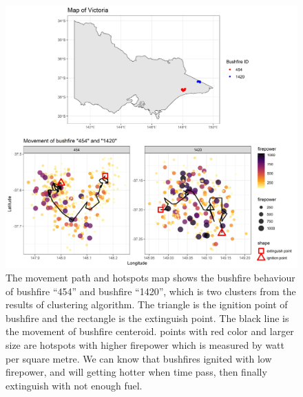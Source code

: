 \documentclass[11pt,a4paper,]{article}
\begin{document}
\begin{figure}
\centering
\includegraphics[width=5.20833in,height=\textheight]{figures/fire_mov.jpg}
\caption{The movement path and hotspots map shows the bushfire behaviour of bushfire ``454'' and bushfire ``1420'', which is two clusters from the results of clustering algorithm. The triangle is the ignition point of bushfire and the rectangle is the extinguish point. The black line is the movement of bushfire centeroid. points with red color and larger size are hotspots with higher firepower which is measured by watt per square metre. We can know that bushfires ignited with low firepower, and will getting hotter when time pass, then finally extinguish with not enough fuel. \label{fig:mov}}
\end{figure}
\end{document}
